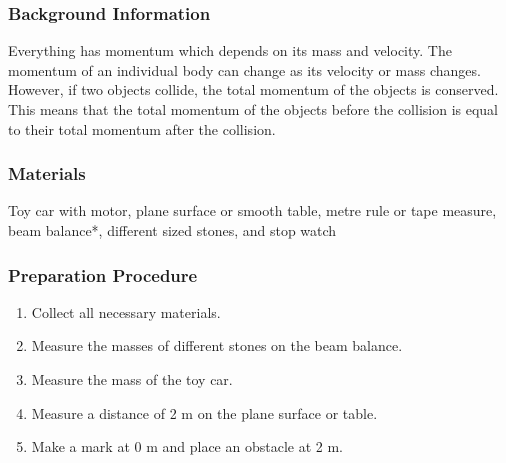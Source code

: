 \subsubsection*{Background Information}
Everything has momentum which depends on its mass and velocity.  The momentum of an individual body can change as its velocity or mass changes.  However, if two objects collide, the total momentum of the objects is conserved.  This means that the total momentum of the objects before the collision is equal to their total momentum after the collision.

\subsubsection*{Materials}
Toy car with motor, plane surface or smooth table, metre rule or tape measure, beam balance*, different sized stones, and stop watch

\subsubsection*{Preparation Procedure}
\begin{enumerate}
\item{Collect all necessary materials.}
\item{Measure the masses of different stones on the beam balance.}
\item{Measure the mass of the toy car.}
\item{Measure a distance of 2 m on the plane surface or table.}
\item{Make a mark at 0 m and place an obstacle at 2 m.}
\end{enumerate}

